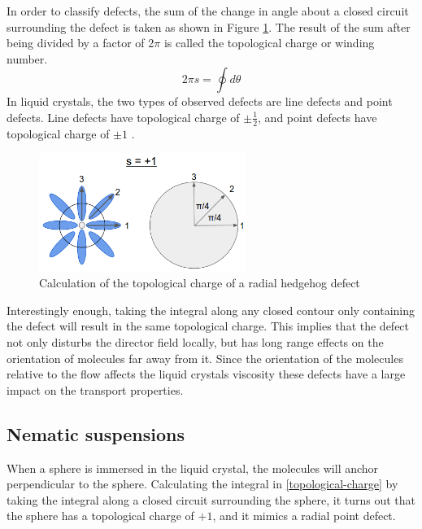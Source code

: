 \documentclass[preprint, aps]{revtex4-1}
\begin{document}
In order to classify defects, the sum of the change in angle about a closed 
circuit surrounding the defect is taken as shown in Figure \ref{fig:circuit}. 
The result of the sum after being divided by a factor of 2$\pi$ is called the 
topological charge or winding number.
	\begin{equation} \label{topological-charge}
		2\pi s = \oint d\theta
	\end{equation}
In liquid crystals, the two types of observed defects are line defects and point
defects. Line defects have topological charge of $\pm\frac{1}{2}$, and point 
defects have topological charge of $\pm1$ \cite{lubensky98}. 
	\begin{figure}[H]
		\centering
		\includegraphics[width=0.6\textwidth]{circuit-calc.png}
		\caption{Calculation of the topological charge of a radial hedgehog
		defect}
		\label{fig:circuit}
	\end{figure}
Interestingly enough, taking the integral along any closed contour only 
containing the defect will result in the same topological charge. This implies 
that the defect not only disturbs the director field locally, but has long range
effects on the orientation of molecules far away from it. Since the orientation
of the molecules relative to the flow affects the liquid crystals viscosity 
these defects have a large impact on the transport properties.

\subsection*{Nematic suspensions}
When a sphere is immersed in the liquid crystal, the molecules will anchor 
perpendicular to the sphere. Calculating the integral in 
\ref{topological-charge} by taking the integral along a closed circuit 
surrounding the sphere, it turns out that the sphere has a topological
charge of $+1$, and it mimics a radial point defect.
\end{document}
